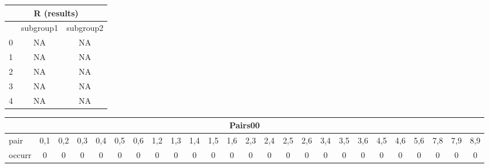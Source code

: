 \begin{tabular} {| l ||c |c |}  
\multicolumn{ 3 }{c}{ R (results) } \\ \hline 
   \  & subgroup1 & subgroup2 \\ \hline \hline 
0 & NA & NA \\ \hline 
1 & NA & NA \\ \hline 
2 & NA & NA \\ \hline 
3 & NA & NA \\ \hline 
4 & NA & NA \\ \hline 
\end{tabular} 

 
\begin{tabular} {| l ||c |c |c |c |c |c |c |c |c |c |c |c |c |c |c |c |c |c |c |c |c |c |c |c |}  
\multicolumn{ 25 }{c}{ Pairs00 } \\ \hline 
pair & 0,1 & 0,2 & 0,3 & 0,4 & 0,5 & 0,6 & 1,2 & 1,3 & 1,4 & 1,5 & 1,6 & 2,3 & 2,4 & 2,5 & 2,6 & 3,4 & 3,5 & 3,6 & 4,5 & 4,6 & 5,6 & 7,8 & 7,9 & 8,9 \\ \hline 
occurr & 0 & 0 & 0 & 0 & 0 & 0 & 0 & 0 & 0 & 0 & 0 & 0 & 0 & 0 & 0 & 0 & 0 & 0 & 0 & 0 & 0 & 0 & 0 & 0 \\ \hline 
\end{tabular}  



